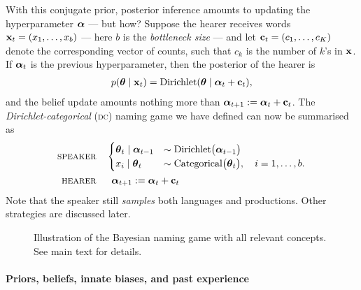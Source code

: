 \documentclass{../src/bcthesispart}
\begin{document}
With this conjugate prior, posterior inference amounts to updating the hyperparameter $\boldsymbol{\mathbf{\alpha}}$ — but how?
Suppose the hearer receives words $\boldsymbol{\mathbf{x}}_t = (x_1, \dots, x_b)$ — here $b$ is the \emph{bottleneck size} — and let $\boldsymbol{\mathbf{c}}_t = (c_1, \dots, c_K)$ denote the corresponding vector of counts, such that $c_k$ is the number of $k$’s in $\boldsymbol{\mathbf{x}}$.
If $\boldsymbol{\mathbf{\alpha}}_t$ is the previous hyperparameter, then the posterior of the hearer is
\begin{align}
	p(\boldsymbol{\mathbf{\theta}} \mid \boldsymbol{\mathbf{x}}_t) = 
		\text{Dirichlet}(\boldsymbol{\mathbf{\theta}} \mid \boldsymbol{\mathbf{\alpha}}_t	+ \boldsymbol{\mathbf{c}}_t),
\end{align}
and the belief update amounts nothing more than $\boldsymbol{\mathbf{\alpha}}_{t+1} := \boldsymbol{\mathbf{\alpha}}_t + \boldsymbol{\mathbf{c}}_t$.
The \emph{Dirichlet-categorical} (\textsc{dc}) naming game we have defined can now be summarised as 
\begin{align}
	\textsc{speaker}
	\quad
	&\begin{cases}
		\boldsymbol{\mathbf{\theta}}_t \mid \boldsymbol{\mathbf{\alpha}}_{t-1}
			&\sim \text{Dirichlet}\bigl(\boldsymbol{\mathbf{\alpha}}_{t-1}\bigr)\\
		x_i \mid \boldsymbol{\mathbf{\theta}}_t
			&\sim \text{Categorical}\bigl(\boldsymbol{\mathbf{\theta}}_t\bigr), \quad i = 1, \dots, b.
	\end{cases}
	\\
	\textsc{hearer}
	\quad
	&\;\;\boldsymbol{\mathbf{\alpha}}_{t+1} 
		:= \boldsymbol{\mathbf{\alpha}}_{t} + \boldsymbol{\mathbf{c}}_t
\end{align}
Note that the speaker still \emph{samples} both languages and productions.
Other strategies are discussed later.




\begin{SCfigure}
	\hspace{-.9cm}
	
	
	\caption{%
	Illustration of the Bayesian naming game with all relevant concepts. See main text for details.
	\label{fig:ch4-bng-terminology}}
\end{SCfigure}




\paragraph{Priors, beliefs, innate biases, and past experience}
\end{document}
